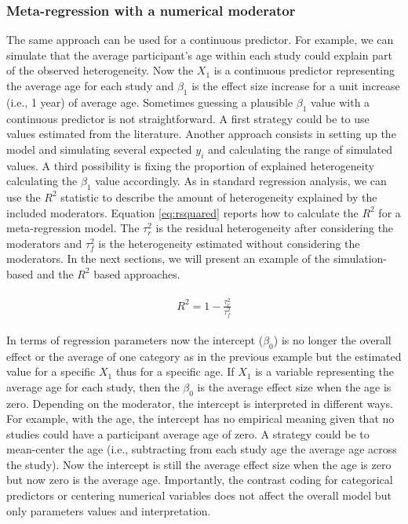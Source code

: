 \documentclass[
  man,floatsintext]{apa6}
\begin{document}
\hypertarget{meta-regression-with-a-numerical-moderator}{%
\subsubsection{Meta-regression with a numerical moderator}\label{meta-regression-with-a-numerical-moderator}}

The same approach can be used for a continuous predictor. For example, we can simulate that the average participant's age within each study could explain part of the observed heterogeneity. Now the \(X_1\) is a continuous predictor representing the average age for each study and \(\beta_1\) is the effect size increase for a unit increase (i.e., 1 year) of average age. Sometimes guessing a plausible \(\beta_1\) value with a continuous predictor is not straightforward. A first strategy could be to use values estimated from the literature. Another approach consists in setting up the model and simulating several expected \(y_i\) and calculating the range of simulated values. A third possibility is fixing the proportion of explained heterogeneity calculating the \(\beta_1\) value accordingly. As in standard regression analysis, we can use the \(R^2\) statistic to describe the amount of heterogeneity explained by the included moderators. Equation \eqref{eq:rsquared} reports how to calculate the \(R^2\) for a meta-regression model. The \(\tau^2_{r}\) is the residual heterogeneity after considering the moderators and \(\tau^2_{f}\) is the heterogeneity estimated without considering the moderators. In the next sections, we will present an example of the simulation-based and the \(R^2\) based approaches.

\begin{align}
\begin{aligned}
R^2 = 1 - \frac{\tau^2_{r}}{\tau^2_{f}}
\label{eq:rsquared}
\end{aligned}
\end{align}

In terms of regression parameters now the intercept (\(\beta_0\)) is no longer the overall effect or the average of one category as in the previous example but the estimated value for a specific \(X_1\) thus for a specific age. If \(X_1\) is a variable representing the average age for each study, then the \(\beta_0\) is the average effect size when the age is zero. Depending on the moderator, the intercept is interpreted in different ways. For example, with the age, the intercept has no empirical meaning given that no studies could have a participant average age of zero. A strategy could be to mean-center the age (i.e., subtracting from each study age the average age across the study). Now the intercept is still the average effect size when the age is zero but now zero is the average age. Importantly, the contrast coding for categorical predictors or centering numerical variables does not affect the overall model but only parameters values and interpretation.
\end{document}
